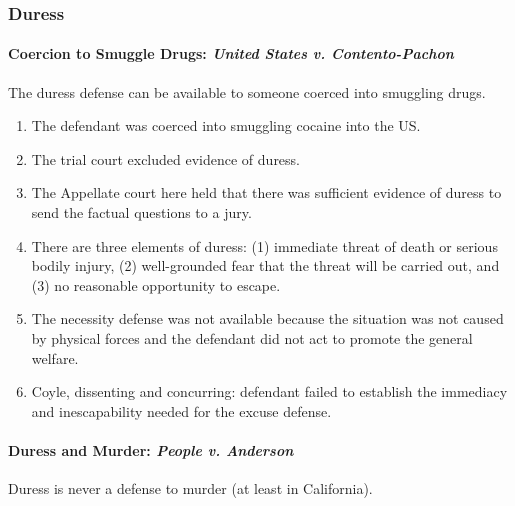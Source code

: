 \subsubsection{Duress}

\paragraph{Coercion to Smuggle Drugs: \emph{United States v. Contento-Pachon}}

The duress defense can be available to someone coerced into smuggling drugs.

\begin{enumerate}
    \item The defendant was coerced into smuggling cocaine into the US. 
    \item The trial court excluded evidence of duress.
    \item The Appellate court here held that there was sufficient evidence of 
    duress to send the factual questions to a jury.
    \item There are three elements of duress: (1) immediate threat of death or 
    serious bodily injury, (2) well-grounded fear that the threat will be 
    carried out, and (3) no reasonable opportunity to escape.
    \item The necessity defense was not available because the situation was 
    not caused by physical forces and the defendant did not act to promote the 
    general welfare.
    \item Coyle, dissenting and concurring: defendant failed to establish the 
    immediacy and inescapability needed for the excuse defense.
\end{enumerate}

\paragraph{Duress and Murder: \emph{People v. Anderson}}

Duress is never a defense to murder (at least in California).

